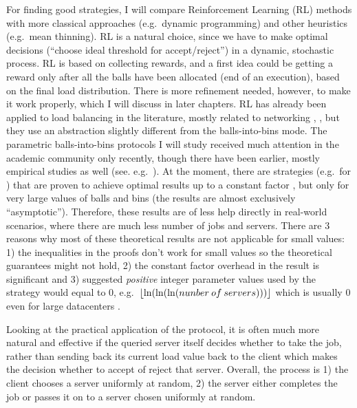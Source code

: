 For finding good strategies, I will compare Reinforcement Learning (RL) methods with more classical approaches (e.g.\ dynamic programming) and other heuristics (e.g.\ mean thinning). RL is a natural choice, since we have to make optimal decisions (``choose ideal threshold for accept/reject'') in a dynamic, stochastic process. RL is based on collecting rewards, and a first idea could be getting a reward only after all the balls have been allocated (end of an execution), based on the final load distribution. There is more refinement needed, however, to make it work properly, which I will discuss in later chapters. RL has already been applied to load balancing in the literature, mostly related to networking \cite{attiah2020RLcellular}, \cite{yeo2021controller}, but they use an abstraction slightly different from the balls-into-bins mode. The parametric balls-into-bins protocols I will study received much attention in the academic community only recently, though there have been earlier, mostly empirical studies as well (see. e.g.\ \cite{derek1986twothinningfirstattempt}). At the moment, there are strategies (e.g.\ for \TwoThinning) that are proven to achieve optimal results up to a constant factor \cite{feldheim2021thinning}, but only for very large values of balls and bins (the results are almost exclusively ``asymptotic''). Therefore, these results are of less help directly in real-world scenarios, where there are much less number of jobs and servers. There are $3$ reasons why most of these theoretical results are not applicable for small values: 1) the inequalities in the proofs don't work for small values \cite{feldheim2021longtermthinning} so the theoretical guarantees might not hold, 2) the constant factor overhead in the result is significant and 3) suggested \textit{positive} integer parameter values used by the strategy would equal to $0$, e.g.\ $\lfloor\ln(\ln(\ln(nunber\: of \: servers)))\rfloor$ which is usually $0$ even for large datacenters \cite{uzaman2019datacentersize}.



Looking at the practical application of the \TwoThinning protocol, it is often much more natural and effective if the queried server itself decides whether to take the job, rather than sending back its current load value back to the client which makes the decision whether to accept of reject that server.  Overall, the process is 1) the client chooses a server uniformly at random, 2) the server either completes the job or passes it on to a server chosen uniformly at random.

